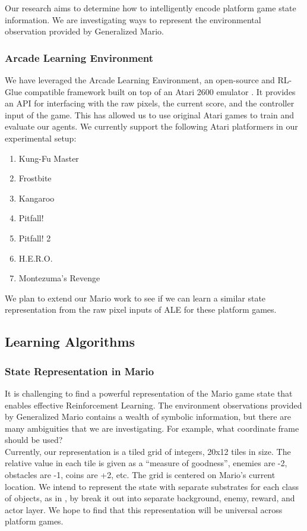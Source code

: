\documentclass{article}
\begin{document}
Our research aims to determine how to intelligently encode platform game state information. We are investigating ways to represent the environmental observation provided by Generalized Mario.

\subsubsection{Arcade Learning Environment}
We have leveraged the Arcade Learning Environment, an open-source and RL-Glue compatible framework built on top of an Atari 2600 emulator \cite{bellemare13}.  It provides an API for interfacing with the raw pixels, the current score, and the controller input of the game. This has allowed us to use original Atari games to train and evaluate our agents. We currently support the following Atari platformers in our experimental setup:
\begin{enumerate} [topsep=0pt,itemsep=-1ex,partopsep=1ex,parsep=1ex]
\item Kung-Fu Master
\item Frostbite
\item Kangaroo
\item Pitfall!
\item Pitfall! 2
\item H.E.R.O.
\item Montezuma's Revenge
\end{enumerate}
We plan to extend our Mario work to see if we can learn a similar state representation from the raw pixel inputs of ALE for these platform games.

\subsection{Learning Algorithms}

\subsubsection{State Representation in Mario}
It is challenging to find a powerful representation of the Mario game state that enables effective Reinforcement Learning. The environment observations provided by Generalized Mario contains a wealth of symbolic information, but there are many ambiguities that we are investigating. For example, what coordinate frame should be used?  \\
Currently, our representation is a tiled grid of integers, 20x12 tiles in size. The relative value in each tile is given as a ``measure of goodness'', enemies are -2, obstacles are -1, coins are +2, etc. The grid is centered on Mario's current location. We intend to represent the state with separate substrates for each class of objects, as in \cite{Hauskneck13}, by break it out into separate background, enemy, reward, and actor layer. We hope to find that this representation will be universal across platform games.
\end{document}
